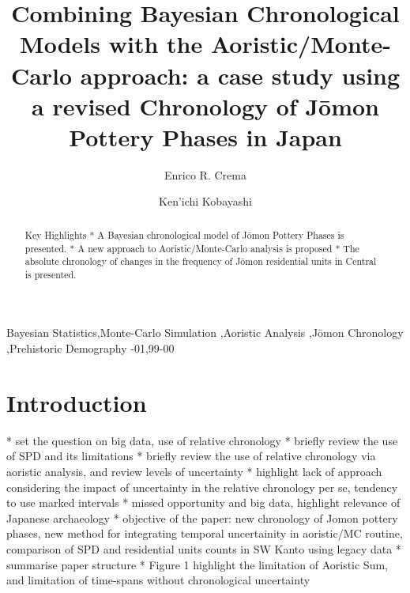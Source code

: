 \documentclass[review]{elsarticle}
\begin{document}
\begin{frontmatter}

\title{Combining Bayesian Chronological Models with the Aoristic/Monte-Carlo approach: a case study using a revised Chronology of J\={o}mon Pottery Phases in Japan}



\author[address1]{Enrico R. Crema}

\author[address2]{Ken'ichi Kobayashi}


\address[address1]{Department of Archaeology, University of Cambridge, Downing Street, CB2 3ER  Cambridge, UK}
\address[address2]{Chuo University, Tokyo, Japan}




\begin{abstract}
Key Highlights
* A Bayesian chronological model of J\=omon Pottery Phases is presented.
* A new approach to Aoristic/Monte-Carlo analysis is proposed
* The absolute chronology of changes in the frequency of J\=omon residential units in Central is presented. 
\end{abstract}


\begin{keyword}
Bayesian Statistics\sep Monte-Carlo Simulation \sep Aoristic Analysis \sep J\=omon Chronology \sep Prehistoric Demography
-01\sep  99-00
\end{keyword}

\end{frontmatter}

\linenumbers

\section{Introduction}
* set the question on big data, use of relative chronology
* briefly review the use of SPD and its limitations
* briefly review the use of relative chronology via aoristic analysis, and review levels of uncertainty
* highlight lack of approach considering the impact of uncertainty in the relative chronology per se, tendency to use marked intervals
* missed opportunity and big data, highlight relevance of Japanese archaeology
* objective of the paper: new chronology of Jomon pottery phases, new method for integrating temporal uncertainity in aoristic/MC routine, comparison of SPD and residential units counts in SW Kanto using legacy data
* summarise paper structure
* Figure 1 highlight the limitation of Aoristic Sum, and limitation of time-spans without chronological uncertainty
\end{document}

